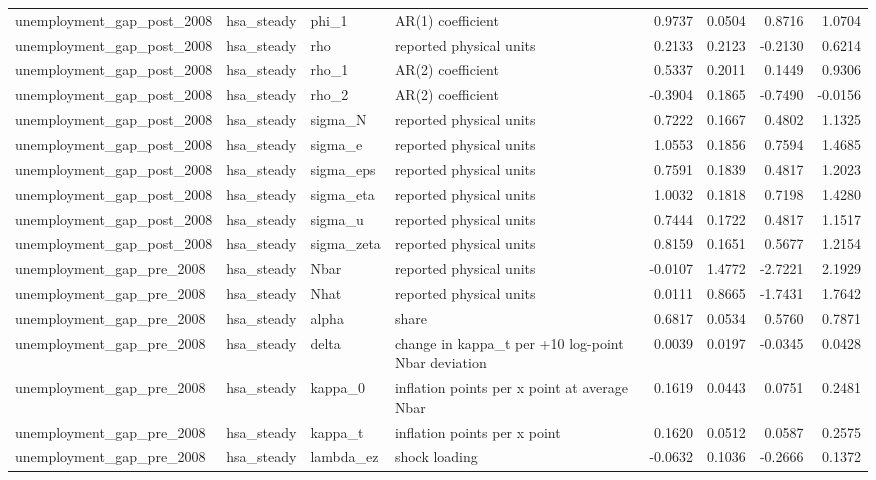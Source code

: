 \begin{tabular}{llllrrrr}
unemployment\_gap\_post\_2008 & hsa\_steady & phi\_1 & AR(1) coefficient & 0.9737 & 0.0504 & 0.8716 & 1.0704 \\
unemployment\_gap\_post\_2008 & hsa\_steady & rho & reported physical units & 0.2133 & 0.2123 & -0.2130 & 0.6214 \\
unemployment\_gap\_post\_2008 & hsa\_steady & rho\_1 & AR(2) coefficient & 0.5337 & 0.2011 & 0.1449 & 0.9306 \\
unemployment\_gap\_post\_2008 & hsa\_steady & rho\_2 & AR(2) coefficient & -0.3904 & 0.1865 & -0.7490 & -0.0156 \\
unemployment\_gap\_post\_2008 & hsa\_steady & sigma\_N & reported physical units & 0.7222 & 0.1667 & 0.4802 & 1.1325 \\
unemployment\_gap\_post\_2008 & hsa\_steady & sigma\_e & reported physical units & 1.0553 & 0.1856 & 0.7594 & 1.4685 \\
unemployment\_gap\_post\_2008 & hsa\_steady & sigma\_eps & reported physical units & 0.7591 & 0.1839 & 0.4817 & 1.2023 \\
unemployment\_gap\_post\_2008 & hsa\_steady & sigma\_eta & reported physical units & 1.0032 & 0.1818 & 0.7198 & 1.4280 \\
unemployment\_gap\_post\_2008 & hsa\_steady & sigma\_u & reported physical units & 0.7444 & 0.1722 & 0.4817 & 1.1517 \\
unemployment\_gap\_post\_2008 & hsa\_steady & sigma\_zeta & reported physical units & 0.8159 & 0.1651 & 0.5677 & 1.2154 \\
unemployment\_gap\_pre\_2008 & hsa\_steady & Nbar & reported physical units & -0.0107 & 1.4772 & -2.7221 & 2.1929 \\
unemployment\_gap\_pre\_2008 & hsa\_steady & Nhat & reported physical units & 0.0111 & 0.8665 & -1.7431 & 1.7642 \\
unemployment\_gap\_pre\_2008 & hsa\_steady & alpha & share & 0.6817 & 0.0534 & 0.5760 & 0.7871 \\
unemployment\_gap\_pre\_2008 & hsa\_steady & delta & change in kappa\_t per +10 log-point Nbar deviation & 0.0039 & 0.0197 & -0.0345 & 0.0428 \\
unemployment\_gap\_pre\_2008 & hsa\_steady & kappa\_0 & inflation points per x point at average Nbar & 0.1619 & 0.0443 & 0.0751 & 0.2481 \\
unemployment\_gap\_pre\_2008 & hsa\_steady & kappa\_t & inflation points per x point & 0.1620 & 0.0512 & 0.0587 & 0.2575 \\
unemployment\_gap\_pre\_2008 & hsa\_steady & lambda\_ez & shock loading & -0.0632 & 0.1036 & -0.2666 & 0.1372 \\

\end{tabular}
